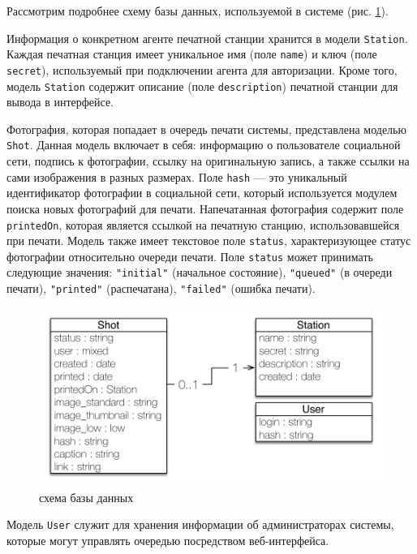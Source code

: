 \documentclass[a4paper,14pt,href,draft]{article}
\begin{document}
Рассмотрим подробнее схему базы данных, используемой в системе (рис. \ref{fig:DataModel}).

Информация о конкретном агенте печатной станции хранится в модели \texttt{Station}. Каждая печатная станция имеет
уникальное имя (поле \texttt{name}) и ключ (поле \texttt{secret}), используемый при подключении агента для авторизации.
Кроме того, модель \texttt{Station} содержит описание (поле \texttt{description}) печатной станции для вывода в интерфейсе.

Фотография, которая попадает в очередь печати системы, представлена моделью \texttt{Shot}. Данная модель включает в себя:
информацию о пользователе социальной сети, подпись к фотографии, ссылку на оригинальную запись, а также ссылки на сами
изображения в разных размерах. Поле \texttt{hash} --- это уникальный идентификатор фотографии в социальной сети, который
используется модулем поиска новых фотографий для печати. Напечатанная фотография содержит поле \texttt{printedOn}, которая
является ссылкой на печатную станцию, использовавшейся при печати. Модель также имеет текстовое поле \texttt{status},
характеризующее статус фотографии относительно очереди печати. Поле \texttt{status} может принимать следующие значения:
\texttt{"initial"} (начальное состояние), \texttt{"queued"} (в очереди печати), \texttt{"printed"} (распечатана), \texttt{"failed"}
(ошибка печати).

\begin{figure}[htbp]
\begin{center}
  \includegraphics[scale=0.8]{data-model-uml.pdf}
    \caption{схема базы данных}
    \label{fig:DataModel}
\end{center}
\end{figure}

Модель \texttt{User} служит для хранения информации об администраторах системы, которые могут управлять очередью посредством
веб-интерфейса.
\end{document}
